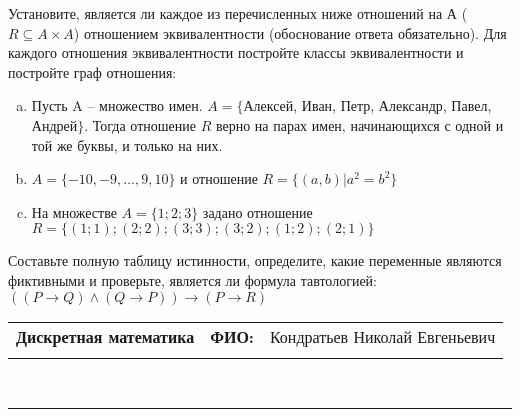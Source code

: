 \documentclass[10pt]{exam}
\newcommand{\class}{Дискретная математика}
\newcommand{\examdate}{}
\begin{document}
\begin{questions}
\question
Установите, является ли каждое из перечисленных ниже отношений на А ($R \subseteq A \times A$) отношением эквивалентности (обоснование ответа обязательно). Для каждого отношения эквивалентности постройте классы 
эквивалентности и постройте граф отношения:
\begin{enumerate} [a)]\setcounter{enumi}{0}
\item Пусть A – множество имен. $A = \{ $Алексей, Иван, Петр, Александр, Павел, Андрей$ \}$. Тогда отношение $R$ верно на парах имен, начинающихся с одной и той же буквы, и только на них.
\item $A = \{-10, -9, … , 9, 10\}$ и отношение $ R = \{(a,b)|a^{2} = b^{2}\}$
\item На множестве $A = \{1; 2; 3\}$ задано отношение $R = \{(1; 1); (2; 2); (3; 3); (3; 2); (1; 2); (2; 1)\}$
\end{enumerate}\question Составьте полную таблицу истинности, определите, какие переменные являются фиктивными и проверьте, является ли формула тавтологией:
$(( P \rightarrow Q) \land (Q \rightarrow P)) \rightarrow (P \rightarrow R)$

\end{questions}
\newpage
\begin{flushright}
\begin{tabular}{p{2.8in} r l}
\textbf{\class} & \textbf{ФИО:} &Кондратьев Николай Евгеньевич
\\

\textbf{\examdate} &&\\
\end{tabular}\\
\end{flushright}
\rule[1ex]{\textwidth}{.1pt}
\end{document}
